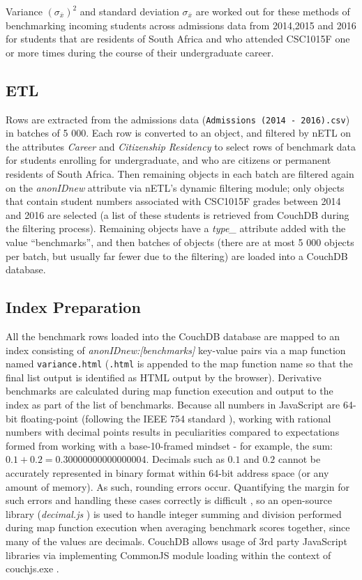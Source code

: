 Variance $(\sigma_{\overline{x}})^{2}$ and standard deviation $\sigma_{\overline{x}}$ are worked out for these methods of benchmarking incoming students across admissions data from 2014,2015 and 2016 for students that are residents of South Africa and who attended CSC1015F one or more times during the course of their undergraduate career.

\subsection{ETL}
Rows are extracted from the admissions data (\texttt{Admissions (2014 - 2016).csv}) in batches of 5 000. Each row is converted to an object, and filtered by nETL on the attributes \textit{Career} and \textit{Citizenship Residency} to select rows of benchmark data for students enrolling for undergraduate, and who are citizens or permanent residents of South Africa. Then remaining objects in each batch are filtered again on the \textit{anonIDnew} attribute via nETL's dynamic filtering module; only objects that contain student numbers associated with CSC1015F grades between 2014 and 2016 are selected (a list of these students is retrieved from CouchDB during the filtering process). Remaining objects have a \textit{type\_} attribute added with the value ``benchmarks'', and then batches of objects (there are at most 5 000 objects per batch, but usually far fewer due to the filtering) are loaded into a CouchDB database.

\subsection{Index Preparation}
All the benchmark rows loaded into the CouchDB database are mapped to an index consisting of \textit{anonIDnew:[benchmarks]} key-value pairs via a map function named \texttt{variance.html} (\texttt{.html} is appended to the map function name so that the final list output is identified as HTML output by the browser). Derivative benchmarks are calculated during map function execution and output to the index as part of the list of benchmarks. Because all numbers in JavaScript are 64-bit floating-point (following the IEEE 754 standard \cite{floatingPoint}), working with rational numbers with decimal points results in peculiarities compared to expectations formed from working with a base-10-framed mindset - for example, the sum: $0.1 + 0.2 = 0.30000000000000004$. Decimals such as $0.1$ and $0.2$ cannot be accurately represented in binary format within 64-bit address space (or any amount of memory). As such, rounding errors occur. Quantifying the margin for such errors and handling these cases correctly is difficult \cite{Goldberg1991}, so an open-source library (\textit{decimal.js} \cite{decimaljs}) is used to handle integer summing and division performed during map function execution when averaging benchmark scores together, since many of the values are decimals. CouchDB allows usage of 3rd party JavaScript libraries via implementing CommonJS module loading within the context of couchjs.exe \cite{commonJsMapFn}.


